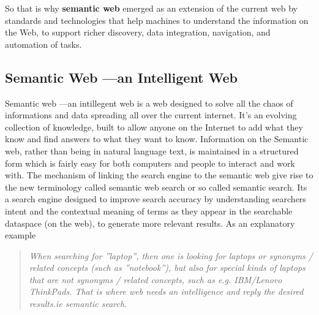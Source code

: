 \documentclass[12pt,a4]{article}
\begin{document}
So that is why \textbf{semantic web} emerged as an extension of the current web by standards and technologies that help machines to understand the information on the Web, to support richer discovery, data integration, navigation, and automation of tasks.

\subsection{Semantic Web ---an Intelligent Web}
Semantic web ---an intillegent web is a web designed to solve all the chaos of informations and data spreading all over the current internet. It's an evolving collection of knowledge, built to allow anyone on the Internet to add what they know and find answers to what they want to know. Information on the Semantic web, rather than being in natural language text, is maintained in a structured form which is fairly easy for both computers and people to interact and work with. 
The mechanism of linking the search engine to the semantic web give rise to the new terminology called semantic web search or so called semantic search. Its a search engine designed to improve search accuracy by understanding searchers intent and the contextual meaning of terms as they appear in the searchable dataspace (on the web), to generate more relevant results. As an explanatory example
\begin{quote}\textit{When searching for ''laptop'', then one is looking for laptops or synonyms / related concepts (such as ''notebook''), but also for special kinds of laptops that are not synonyms / related concepts, such as e.g. IBM/Lenovo ThinkPads. That is where web needs an intelligence and reply the desired results.ie semantic search.}
\end{quote}
\end{document}
